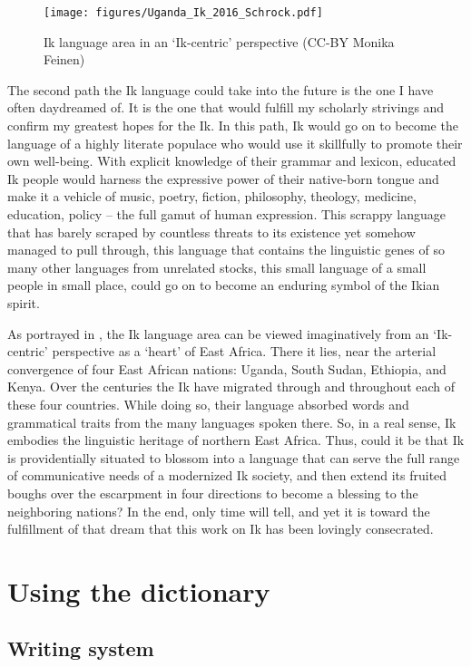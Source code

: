    

\begin{figure}
\texttt{[image: figures/Uganda\_Ik\_2016\_Schrock.pdf]}
\caption{Ik language area in an ‘Ik-centric’ perspective \tiny{(CC-BY Monika Feinen)}}
\label{fig:1}
\end{figure}

The second path the Ik language could take into the future is the one I have often daydreamed of. It is the one that would fulfill my scholarly strivings and confirm my greatest hopes for the Ik. In this path, Ik would go on to become the language of a highly literate populace who would use it skillfully to promote their own well-being. With explicit knowledge of their grammar and lexicon, educated Ik people would harness the expressive power of their native-born tongue and make it a vehicle of music, poetry, fiction, philosophy, theology, medicine, education, policy – the full gamut of human expression. This scrappy language that has barely scraped by countless threats to its existence yet somehow managed to pull through, this language that contains the linguistic genes of so many other languages from unrelated stocks, this small language of a small people in small place, could go on to become an enduring symbol of the Ikian spirit. 

As portrayed in , the Ik language area can be viewed imaginatively from an ‘Ik-centric’ perspective as a ‘heart’ of East Africa. There it lies, near the arterial convergence of four East African nations: Uganda, South Sudan, Ethiopia, and Kenya. Over the centuries the Ik have migrated through and throughout each of these four countries. While doing so, their language absorbed words and grammatical traits from the many languages spoken there. So, in a real sense, Ik embodies the linguistic heritage of northern East Africa. Thus, could it  be that Ik is providentially situated to blossom into a language that can serve the full range of communicative needs of a modernized Ik society, and then extend its fruited boughs over the escarpment in four directions to become a blessing to the neighboring nations? In the end, only time will tell, and yet it is toward the fulfillment of that dream that this work on Ik has been lovingly consecrated.
 
\section{Using the dictionary}\label{sec:1.3}
\subsection{Writing system}\label{sec:1.3.1}

